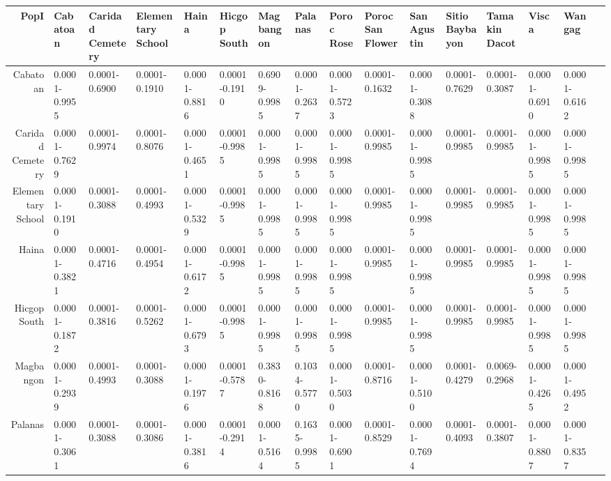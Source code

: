 \documentclass[11pt]{article}
\begin{document}
    
    \begin{tabular}{r|lllllllllllllll}
 PopI & Cabatoan & Caridad Cemetery & Elementary School & Haina & Hicgop South & Magbangon & Palanas & Poroc Rose & Poroc San Flower & San Agustin & Sitio Baybayon & Tamakin Dacot & Visca & Wangag\\
\hline
	 Cabatoan          & 0.0001-0.9955     & 0.0001-0.6900     & 0.0001-0.1910     & 0.0001-0.8816     & 0.0001-0.1910     & 0.6909-0.9985     & 0.0001-0.2637     & 0.0001-0.5723     & 0.0001-0.1632     & 0.0001-0.3088     & 0.0001-0.7629     & 0.0001-0.3087     & 0.0001-0.6910     & 0.0001-0.6162    \\
	 Caridad Cemetery  & 0.0001-0.7629     & 0.0001-0.9974     & 0.0001-0.8076     & 0.0001-0.4651     & 0.0001-0.9985     & 0.0001-0.9985     & 0.0001-0.9985     & 0.0001-0.9985     & 0.0001-0.9985     & 0.0001-0.9985     & 0.0001-0.9985     & 0.0001-0.9985     & 0.0001-0.9985     & 0.0001-0.9985    \\
	 Elementary School & 0.0001-0.1910     & 0.0001-0.3088     & 0.0001-0.4993     & 0.0001-0.5329     & 0.0001-0.9985     & 0.0001-0.9985     & 0.0001-0.9985     & 0.0001-0.9985     & 0.0001-0.9985     & 0.0001-0.9985     & 0.0001-0.9985     & 0.0001-0.9985     & 0.0001-0.9985     & 0.0001-0.9985    \\
	 Haina             & 0.0001-0.3821     & 0.0001-0.4716     & 0.0001-0.4954     & 0.0001-0.6172     & 0.0001-0.9985     & 0.0001-0.9985     & 0.0001-0.9985     & 0.0001-0.9985     & 0.0001-0.9985     & 0.0001-0.9985     & 0.0001-0.9985     & 0.0001-0.9985     & 0.0001-0.9985     & 0.0001-0.9985    \\
	 Hicgop South      & 0.0001-0.1872     & 0.0001-0.3816     & 0.0001-0.5262     & 0.0001-0.6793     & 0.0001-0.9985     & 0.0001-0.9985     & 0.0001-0.9985     & 0.0001-0.9985     & 0.0001-0.9985     & 0.0001-0.9985     & 0.0001-0.9985     & 0.0001-0.9985     & 0.0001-0.9985     & 0.0001-0.9985    \\
	 Magbangon         & 0.0001-0.2939     & 0.0001-0.4993     & 0.0001-0.3088     & 0.0001-0.1976     & 0.0001-0.5787     & 0.3830-0.8168     & 0.1034-0.5770     & 0.0001-0.5030     & 0.0001-0.8716     & 0.0001-0.5100     & 0.0001-0.4279     & 0.0069-0.2968     & 0.0001-0.4265     & 0.0001-0.4952    \\
	 Palanas           & 0.0001-0.3061     & 0.0001-0.3088     & 0.0001-0.3086     & 0.0001-0.3816     & 0.0001-0.2914     & 0.0001-0.5164     & 0.1635-0.9985     & 0.0001-0.6901     & 0.0001-0.8529     & 0.0001-0.7694     & 0.0001-0.4093     & 0.0001-0.3807     & 0.0001-0.8807     & 0.0001-0.8357    \\

\end{tabular}
\end{document}
